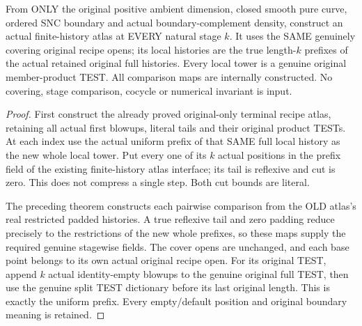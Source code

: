 \begin{theorem}
\label{hir:sharp-actual-curve-original-uniform-stage-atlas}
\leanok
From ONLY the original positive ambient dimension, closed smooth pure
curve, ordered SNC boundary and actual boundary-complement density,
construct an actual finite-history atlas at EVERY natural stage $k$.
It uses the SAME genuinely covering original recipe opens; its local
histories are the true length-$k$ prefixes of the actual retained
original full histories. Every local tower is a genuine original
member-product TEST. All comparison maps are internally constructed.
No covering, stage comparison, cocycle or numerical invariant is input.
\end{theorem}
\begin{proof}
First construct the already proved original-only terminal recipe atlas,
retaining all actual first blowups, literal tails and their original
product TESTs. At each index use the actual uniform prefix of that
SAME full local history as the new whole local tower. Put every one
of its $k$ actual positions in the prefix field of the existing
finite-history atlas interface; its tail is reflexive and cut is zero.
This does not compress a single step. Both cut bounds are literal.

The preceding theorem constructs each pairwise comparison from the
OLD atlas's real restricted padded histories. A true reflexive tail
and zero padding reduce precisely to the restrictions of the new
whole prefixes, so these maps supply the required genuine stagewise
fields. The cover opens are unchanged, and each base point belongs
to its own actual original recipe open. For its original TEST, append
$k$ actual identity-empty blowups to the genuine original full TEST,
then use the genuine split TEST dictionary before its last original
length. This is exactly the uniform prefix. Every empty/default
position and original boundary meaning is retained.
\end{proof}

